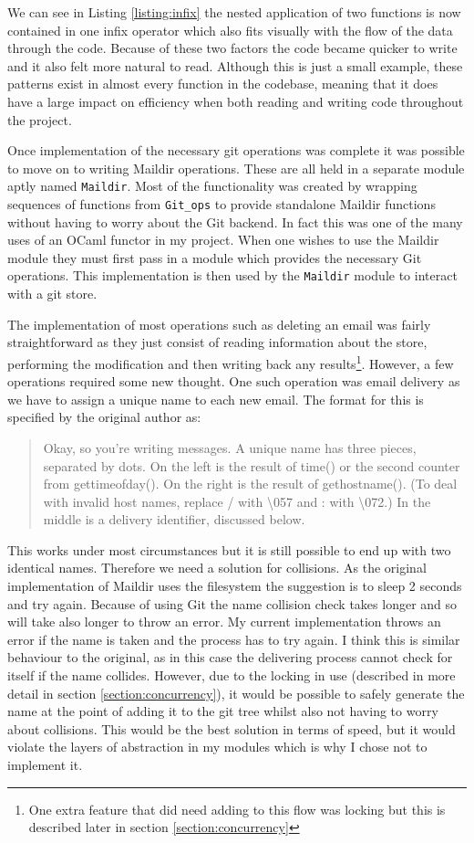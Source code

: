 We can see in Listing \ref{listing:infix} the nested application of two functions is now contained in one infix operator which also fits visually with the flow of the data through the code. Because of these two factors the code became quicker to write and it also felt more natural to read. Although this is just a small example, these patterns exist in almost every function in the codebase, meaning that it does have a large impact on efficiency when both reading and writing code throughout the project.

Once implementation of the necessary git operations was complete it was possible to move on to writing Maildir operations. These are all held in a separate module aptly named \texttt{Maildir}. Most of the functionality was created by wrapping sequences of functions from \texttt{Git\_ops} to provide standalone Maildir functions without having to worry about the Git backend. In fact this was one of the many uses of an OCaml functor in my project. When one wishes to use the Maildir module they must first pass in a module which provides the necessary Git operations. This implementation is then used by the \texttt{Maildir} module to interact with a git store.

The implementation of most operations such as deleting an email was fairly straightforward as they just consist of reading information about the store, performing the modification and then writing back any results\footnote{One extra feature that did need adding to this flow was locking but this is described later in section \ref{section:concurrency}}. However, a few operations required some new thought. One such operation was email delivery as we have to assign a unique name to each new email. The format for this is specified by the original author\cite{bernstein2000maildir} as:
\begin{quote}
  Okay, so you're writing messages. A unique name has three pieces, separated by dots. On the left is the result of time() or the second counter from gettimeofday(). On the right is the result of gethostname(). (To deal with invalid host names, replace / with \textbackslash057 and : with \textbackslash072.) In the middle is a delivery identifier, discussed below.
\end{quote}
This works under most circumstances but it is still possible to end up with two identical names. Therefore we need a solution for collisions. As the original implementation of Maildir uses the filesystem the suggestion is to sleep 2 seconds and try again. Because of using Git the name collision check takes longer and so will take also longer to throw an error. My current implementation throws an error if the name is taken and the process has to try again. I think this is similar behaviour to the original, as in this case the delivering process cannot check for itself if the name collides. However, due to the locking in use (described in more detail in section \ref{section:concurrency}), it would be possible to safely generate the name at the point of adding it to the git tree whilst also not having to worry about collisions. This would be the best solution in terms of speed, but it would violate the layers of abstraction in my modules which is why I chose not to implement it.

